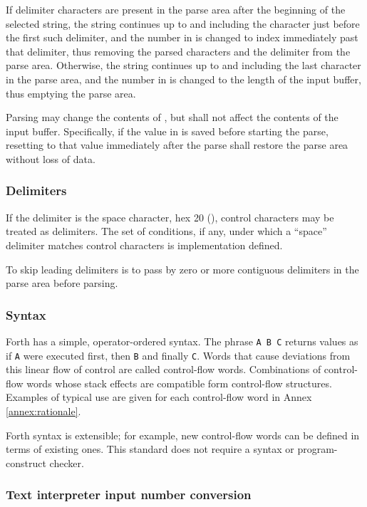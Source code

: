 If delimiter characters are present in the parse area after the
beginning of the selected string, the string continues up to and
including the character just before the first such delimiter, and
the number in  is changed to index immediately past that
delimiter, thus removing the parsed characters and the delimiter
from the parse area. Otherwise, the string continues up to and
including the last character in the parse area, and the number in
 is changed to the length of the input buffer, thus
emptying the parse area.

Parsing may change the contents of , but shall not affect
the contents of the input buffer. Specifically, if the value in
 is saved before starting the parse, resetting 
to that value immediately after the parse shall restore the parse
area without loss of data.

\subsubsection{Delimiters} %
\label{usage:delim}

If the delimiter is the space character, hex 20 (), control
characters may be treated as delimiters. The set of conditions, if
any, under which a ``space'' delimiter matches control characters is
implementation defined.

To skip leading delimiters is to pass by zero or more contiguous
delimiters in the parse area before parsing.

\subsubsection{Syntax} %
\label{usage:syntax}

Forth has a simple, operator-ordered syntax. The phrase
\texttt{A B C} returns values as if \texttt{A} were executed first,
then \texttt{B} and finally \texttt{C}. Words that cause deviations
from this linear flow of control are called control-flow words.
Combinations of control-flow words whose stack effects are
compatible form control-flow structures. Examples of typical use are
given for each control-flow word in Annex \ref{annex:rationale}.

Forth syntax is extensible; for example, new control-flow words can
be defined in terms of existing ones. This standard does not require
a syntax or program-construct checker.

\subsubsection{Text interpreter input number conversion} %
\label{usage:numbers}

